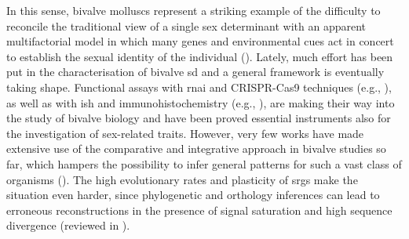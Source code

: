 \documentclass[../main.tex]{subfiles}
\begin{document}
In this sense, bivalve molluscs represent a striking example of the difficulty to reconcile the traditional view of a single sex determinant with an apparent multifactorial model in which many genes and environmental cues act in concert to establish the sexual identity of the individual (\textbf{\cite{breton2018sex}}). Lately, much effort has been put in the characterisation of bivalve \gls{sd} and a general framework is eventually taking shape. Functional assays with \gls{rnai} and CRISPR-Cas9 techniques (e.g., \textbf{\cite{wang2020identification,sun2022examination,wang2022transcriptome}}), as well as with \gls{ish} and immunohistochemistry (e.g., \textbf{\cite{perez2011cytogenetic,milani2013nuclear}}), are making their way into the study of bivalve biology and have been proved essential instruments also for the investigation of sex-related traits. However, very few works have made extensive use of the comparative and integrative approach in bivalve studies so far, which hampers the possibility to infer general patterns for such a vast class of organisms (\textbf{\cite{milani2020faraway}}). The high evolutionary rates and plasticity of \glspl{srg} make the situation even harder, since phylogenetic and orthology inferences can lead to erroneous reconstructions in the presence of signal saturation and high sequence divergence (reviewed in \textbf{\cite{natsidis2021systematic,lozano2022practical}}).
\end{document}
